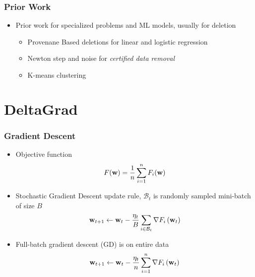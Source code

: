 \documentclass[pdf]{beamer}
\begin{document}
\begin{frame}
  \frametitle{Prior Work}
  \begin{itemize}
    \item Prior work for specialized problems and ML models, usually for deletion
    \begin{itemize}
      \item Provenane Based deletions for linear and logistic regression \cite{wuPrIUProvenanceBasedApproach2020}
      \item Newton step and noise for \textit{certified data removal} \cite{guoCertifiedDataRemoval2020}
      \item K-means clustering \cite{ginartMakingAIForget2019}
    \end{itemize}
  \end{itemize}
\end{frame}

\section{DeltaGrad}
\begin{frame}
  \frametitle{Gradient Descent}
  \begin{itemize}
    \item Objective function  
    \[
        F(\textbf{w}) = \frac{1}{n}\sum_{i=1}^{n}F_{i}(\textbf{w})  
    \]
    \item Stochastic Gradient Descent update rule, $\mathcal{B}_{t}$ is randomly sampled mini-batch of size $B$
    \[
      \textbf{w}_{t+1} \leftarrow \textbf{w}_{t}-\frac{\eta_{t}}{B} \sum_{i \in \mathcal{B}_{t}} \nabla F_{i}\left(\textbf{w}_{t}\right) 
    \]
    \item Full-batch gradient descent (GD) is on entire data 
    \[
      \textbf{w}_{t+1} \leftarrow \textbf{w}_{t}-\frac{\eta_{t}}{n} \sum_{i=1}^{n} \nabla F_{i}\left(\textbf{w}_{t}\right) 
    \]
  \end{itemize} 
\end{frame}
\end{document}
